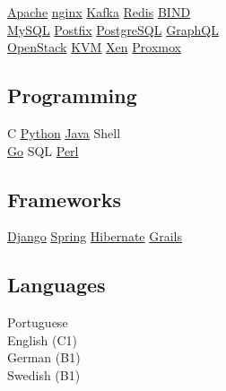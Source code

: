 \documentclass[]{willianpaixao-resume}
\begin{document}
\begin{minipage}[t]{0.35\textwidth}
\href{https://httpd.apache.org/}{Apache}\textbullet{}
\href{https://nginx.org/}{nginx}\textbullet{}
\href{https://kafka.apache.org/}{Kafka}\textbullet{}
\href{https://redis.io/}{Redis}\textbullet{}
\href{https://www.isc.org/bind/}{BIND}\\
\href{https://www.mysql.com/}{MySQL}\textbullet{}
\href{https://www.postfix.org/}{Postfix}\textbullet{}
\href{https://www.postgresql.org/}{PostgreSQL}\textbullet{}
\href{https://graphql.org/}{GraphQL}\\
\href{https://www.openstack.org/}{OpenStack}\textbullet{}
\href{https://linux-kvm.org/}{KVM}\textbullet{}
\href{https://xenproject.org/}{Xen} \textbullet{}
\href{https://www.proxmox.com/}{Proxmox}\\
\sectionsep

\subsection{Programming}
C\textbullet
\href{http://www.python.org}{Python}\textbullet{}
\href{https://www.oracle.com/java/}{Java}\textbullet{}
Shell\\
\href{https://go.dev/}{Go}\textbullet{}
SQL\textbullet{}
\href{https://www.perl.org/}{Perl}
\sectionsep

\subsection{Frameworks}
\href{https://www.djangoproject.com/}{Django}\textbullet{}
\href{https://spring.io/}{Spring}\textbullet{}
\href{http://hibernate.org/}{Hibernate}\textbullet{}
\href{https://grails.org/}{Grails}
\sectionsep

\subsection{Languages}
Portuguese\\
English (C1)\\
German (B1)\\
Swedish (B1)


\end{minipage} 
\hfill
\end{document}
